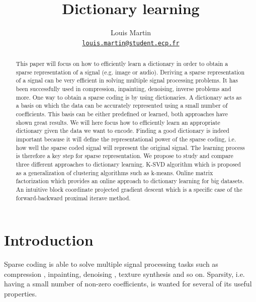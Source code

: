 \documentclass[a4paper,11pt]{article}
\title{Dictionary learning}
\author{
  Louis Martin\\
  \href{mailto:louis.martin@student.ecp.fr}{\tt louis.martin@student.ecp.fr}
}
\begin{document}
\maketitle

\begin{abstract}
This paper will focus on how to efficiently learn a dictionary in order to obtain a sparse representation of a signal (e.g. image or audio).
Deriving a sparse representation of a signal can be very efficient in solving multiple signal processing problems.
It has been successfully used in compression, inpainting, denoising, inverse problems and more.
One way to obtain a sparse coding is by using dictionaries.
A dictionary acts as a basis on which the data can be accurately represented using a small number of coefficients.
This basis can be either predefined or learned, both approaches have shown great results.
We will here focus how to efficiently learn an appropriate dictionary given the data we want to encode.
Finding a good dictionary is indeed important because it will define the representational power of the sparse coding,
i.e. how well the sparse coded signal will represent the original signal.
The learning process is therefore a key step for sparse representation.
We propose to study and compare three different approaches to dictionary learning.
K-SVD algorithm which is proposed as a generalization of clustering algorithms such as k-means.
Online matrix factorization which provides an online approach to dictionary learning for big datasets.
An intuitive block coordinate projected gradient descent which is a specific case of the forward-backward proximal iterave method.

\end{abstract}

\section{Introduction}
Sparse coding is able to solve multiple signal processing tasks such as compression \cite{marcellin00}, inpainting, denoising \cite{elad06}, texture synthesis \cite{peyre09} and so on.
Sparsity, i.e. having a small number of non-zero coefficients, is wanted for several of its useful properties.
\end{document}
